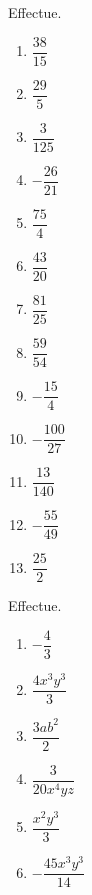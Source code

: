 \documentclass[12pt,parskip=half-, twoside=semi]{scrartcl}
\begin{document}
  \setcounter{exercise}{0} 

  \begin{exercise}
    Effectue.
    \begin{enumerate}[cols=3]    
      \item $\dfrac{38}{15}$ 
      \item $\dfrac{29}{5}$ 
      \item $\dfrac{3}{125}$ 
      \item $-\dfrac{26}{21}$ 
      \item $\dfrac{75}{4}$
      \item $\dfrac{43}{20}$
      \item $\dfrac{81}{25}$   
      \item $\dfrac{59}{54}$
      \item $-\dfrac{15}{4}$  
      \item $-\dfrac{100}{27}$ 
      \item $\dfrac{13}{140}$
      \item $-\dfrac{55}{49}$
      \item $\dfrac{25}{2}$   
    \end{enumerate}
  \end{exercise}

  \begin{exercise}
    Effectue.
    \begin{enumerate}[cols=2]
      \item $-\dfrac{4}{3}$
      \item $\dfrac{4x^3y^3}{3}$
      \item $\dfrac{3ab^2}{2}$ 
      \item $\dfrac{3}{20x^4yz}$ 
      \item $\dfrac{x^2y^3}{3}$ 
      \item $-\dfrac{45x^3y^3}{14}$ 
    \end{enumerate}
  \end{exercise}
    
  
\end{document}
